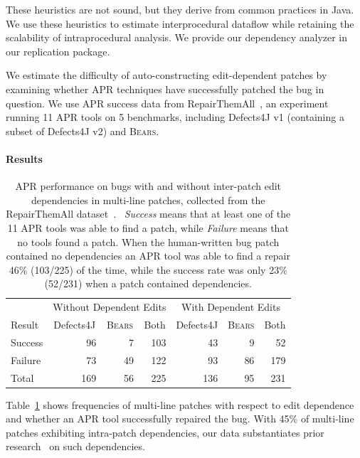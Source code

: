 \documentclass[10pt, conference]{IEEEtran}
\newcommand\bears{\textsc{Bears}\xspace}
\begin{document}
These heuristics are not sound, but they derive from common 
practices in Java. We use these heuristics to estimate interprocedural 
dataflow while retaining the scalability of intraprocedural analysis.
We provide our dependency analyzer in our replication package.

We estimate the difficulty of auto-constructing edit-dependent patches 
by examining whether APR techniques have successfully patched the
bug in question. We use APR success data from 
RepairThemAll~\cite{durieux-repair-them-all}, an experiment 
running 11 APR tools on 5 benchmarks, including Defects4J v1
(containing a subset of Defects4J v2) and \bears.

\paragraph{Results}

\begin{table}
{\begin{center}
    \begin{tabular}{lrrrrrr}
        \toprule
        &\multicolumn{3}{c}{Without Dependent Edits} & \multicolumn{3}{c}{With Dependent Edits} \\
        Result& \multicolumn{1}{c}{Defects4J} & \multicolumn{1}{c}{\bears} & \multicolumn{1}{c}{Both} & \multicolumn{1}{c}{Defects4J} & \multicolumn{1}{c}{\bears} & \multicolumn{1}{c}{Both} \\
        \midrule
        Success & 96 & 7 & 103 & 43 & 9 &  52 \\
        Failure & 73 & 49 & 122 & 93 & 86 & 179\\
        \midrule
        Total  & 169 & 56 & 225 & 136 & 95 & 231\\
        \bottomrule
    \end{tabular}
 \end{center}
}
	\caption{APR performance on bugs with and without inter-patch edit
      dependencies in multi-line patches, collected from the RepairThemAll
      dataset~\cite{durieux-repair-them-all}.\protect\footnotemark
      \ \emph{Success} means that at least one of the 11 APR tools was able to
      find a patch, while \emph{Failure} means that no tools found a patch. When
      the human-written bug patch contained no dependencies an APR tool
      was able to find a repair 46\% (103/225) of the time, while the success
      rate was only 23\% (52/231) when a patch contained dependencies.}
	\label{tab:dependency-repair-contingency-table}
\end{table}
Table~\ref{tab:dependency-repair-contingency-table}
shows frequencies of multi-line patches with respect to edit dependence 
and whether an APR tool successfully repaired the bug.
With 45\% of multi-line patches exhibiting intra-patch dependencies, 
our data substantiates prior research~\cite{zhong2015} on 
such dependencies.
\end{document}
